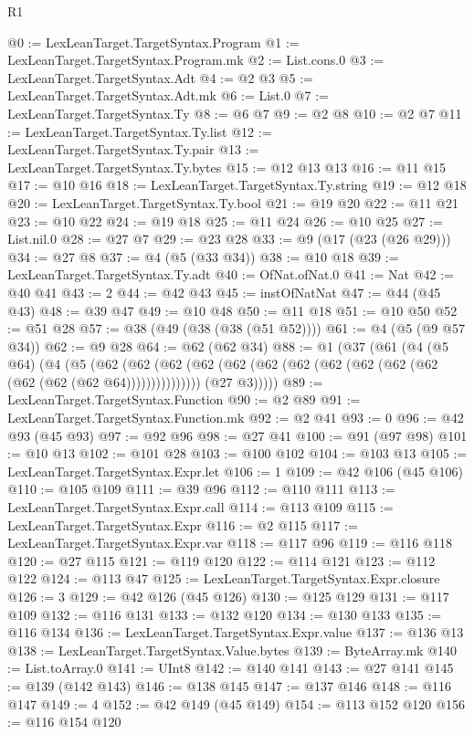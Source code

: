 \begin{lexlean}{R1}
\begin{coremodule}
@0 := LexLeanTarget.TargetSyntax.Program
@1 := LexLeanTarget.TargetSyntax.Program.mk
@2 := List.cons.{0}
@3 := LexLeanTarget.TargetSyntax.Adt
@4 := @2 @3
@5 := LexLeanTarget.TargetSyntax.Adt.mk
@6 := List.{0}
@7 := LexLeanTarget.TargetSyntax.Ty
@8 := @6 @7
@9 := @2 @8
@10 := @2 @7
@11 := LexLeanTarget.TargetSyntax.Ty.list
@12 := LexLeanTarget.TargetSyntax.Ty.pair
@13 := LexLeanTarget.TargetSyntax.Ty.bytes
@15 := @12 @13 @13
@16 := @11 @15
@17 := @10 @16
@18 := LexLeanTarget.TargetSyntax.Ty.string
@19 := @12 @18
@20 := LexLeanTarget.TargetSyntax.Ty.bool
@21 := @19 @20
@22 := @11 @21
@23 := @10 @22
@24 := @19 @18
@25 := @11 @24
@26 := @10 @25
@27 := List.nil.{0}
@28 := @27 @7
@29 := @23 @28
@33 := @9 (@17 (@23 (@26 @29)))
@34 := @27 @8
@37 := @4 (@5 (@33 @34))
@38 := @10 @18
@39 := LexLeanTarget.TargetSyntax.Ty.adt
@40 := OfNat.ofNat.{0}
@41 := Nat
@42 := @40 @41
@43 := 2
@44 := @42 @43
@45 := instOfNatNat
@47 := @44 (@45 @43)
@48 := @39 @47
@49 := @10 @48
@50 := @11 @18
@51 := @10 @50
@52 := @51 @28
@57 := @38 (@49 (@38 (@38 (@51 @52))))
@61 := @4 (@5 (@9 @57 @34))
@62 := @9 @28
@64 := @62 (@62 @34)
@88 := @1
    (@37
      (@61
        (@4
          (@5 @64)
          (@4
            (@5
              (@62
                (@62 (@62 (@62 (@62 (@62 (@62 (@62 (@62 (@62 (@62 (@62 (@62 (@62 @64)))))))))))))))
            (@27 @3)))))
@89 := LexLeanTarget.TargetSyntax.Function
@90 := @2 @89
@91 := LexLeanTarget.TargetSyntax.Function.mk
@92 := @2 @41
@93 := 0
@96 := @42 @93 (@45 @93)
@97 := @92 @96
@98 := @27 @41
@100 := @91 (@97 @98)
@101 := @10 @13
@102 := @101 @28
@103 := @100 @102
@104 := @103 @13
@105 := LexLeanTarget.TargetSyntax.Expr.let
@106 := 1
@109 := @42 @106 (@45 @106)
@110 := @105 @109
@111 := @39 @96
@112 := @110 @111
@113 := LexLeanTarget.TargetSyntax.Expr.call
@114 := @113 @109
@115 := LexLeanTarget.TargetSyntax.Expr
@116 := @2 @115
@117 := LexLeanTarget.TargetSyntax.Expr.var
@118 := @117 @96
@119 := @116 @118
@120 := @27 @115
@121 := @119 @120
@122 := @114 @121
@123 := @112 @122
@124 := @113 @47
@125 := LexLeanTarget.TargetSyntax.Expr.closure
@126 := 3
@129 := @42 @126 (@45 @126)
@130 := @125 @129
@131 := @117 @109
@132 := @116 @131
@133 := @132 @120
@134 := @130 @133
@135 := @116 @134
@136 := LexLeanTarget.TargetSyntax.Expr.value
@137 := @136 @13
@138 := LexLeanTarget.TargetSyntax.Value.bytes
@139 := ByteArray.mk
@140 := List.toArray.{0}
@141 := UInt8
@142 := @140 @141
@143 := @27 @141
@145 := @139 (@142 @143)
@146 := @138 @145
@147 := @137 @146
@148 := @116 @147
@149 := 4
@152 := @42 @149 (@45 @149)
@154 := @113 @152 @120
@156 := @116 @154 @120

\end{coremodule}
\end{lexlean}
